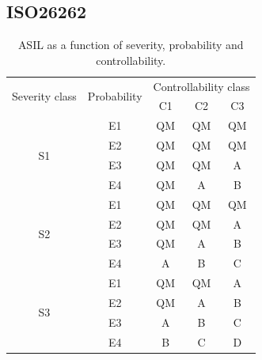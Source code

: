 \subsection{ISO26262}

\begin{table}[h]
\centering
\begin{tabular}{|c|c|c|c|c|}
\hline
\multirow{2}{*}{Severity class} &\multirow{2}{*}{Probability} &\multicolumn{3}{|c|}{Controllability class} \\ \cline{3-5}
& &C1 &C2 &C3 \\ \hline
\multirow{4}{*}{S1} & E1 & QM & QM & QM \\ \cline{2-5}
 & E2 & QM & QM & QM \\ \cline{2-5}
 & E3 & QM & QM & A \\ \cline{2-5}
 & E4 & QM & A & B \\ \hline
\multirow{4}{*}{S2} & E1 & QM & QM & QM \\ \cline{2-5}
 & E2 & QM & QM & A \\ \cline{2-5}
 & E3 & QM & A & B \\ \cline{2-5}
 & E4 & A & B & C \\ \hline
\multirow{4}{*}{S3} & E1 & QM & QM & A \\ \cline{2-5}
 & E2 & QM & A & B \\ \cline{2-5}
 & E3 & A & B & C \\ \cline{2-5}
 & E4 & B & C & D \\ \hline
\end{tabular}
\caption{ASIL as a function of severity, probability and controllability.}
\label{table:ASIL}
\end{table}